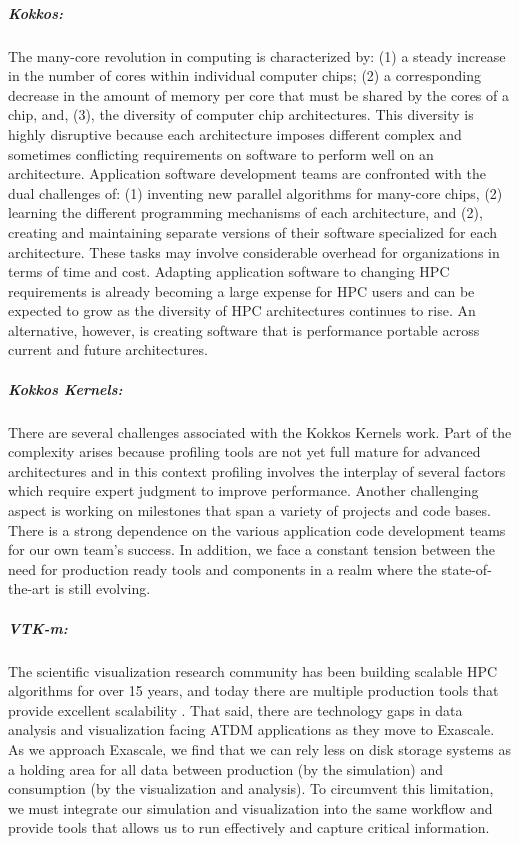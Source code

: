 \subparagraph{Kokkos:} The many-core revolution in computing is characterized by:
(1) a steady increase in the number of cores within individual computer chips;
(2) a corresponding decrease in the amount of memory per core that must be shared by the cores of a chip, and,
(3), the diversity of computer chip architectures.
This diversity is highly disruptive because each architecture imposes different complex
and sometimes conflicting requirements on software to perform well on an architecture.
Application software development teams are confronted with the dual challenges of:
(1) inventing new parallel algorithms for many-core chips,
(2) learning the different programming mechanisms of each architecture, and
(2), creating and maintaining separate versions of their software specialized for each architecture.
These tasks may involve considerable overhead for organizations in terms of time and cost.
Adapting application software to changing HPC requirements is already becoming a large expense for
HPC users and can be expected to grow as the diversity of HPC architectures continues to rise.
An alternative, however, is creating software that is performance portable across current and future architectures.

\subparagraph{Kokkos Kernels:} There are several challenges associated with the Kokkos Kernels work. Part of the complexity arises because profiling tools are not yet full mature for advanced architectures and in this context profiling involves the interplay of several factors which require expert judgment to improve performance.  Another challenging aspect is working on milestones that span a variety of projects and code bases. There is a strong dependence on the various application code development teams for our own team's success. In addition, we face a constant tension between the need for production ready tools and components in a realm where the state-of-the-art is still evolving.

\subparagraph{VTK-m:} The scientific visualization research community has been building scalable HPC algorithms for over 15 years, and today there are multiple production tools that provide excellent scalability \cite{ParaView,Catalyst}. That said, there are technology gaps in data analysis and visualization facing ATDM applications as they move to Exascale.  As we approach Exascale, we find that we can rely less on disk storage systems as a holding area for all data between production (by the simulation) and consumption (by the visualization and analysis). To circumvent this limitation, we must integrate our simulation and visualization into the same workflow and provide tools that allows us to run effectively and capture critical information.

